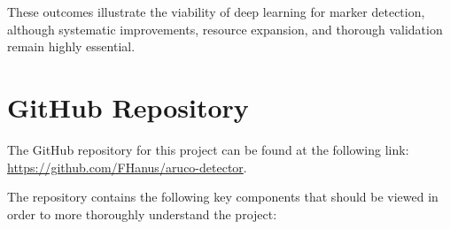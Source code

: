 \documentclass[conference]{IEEEtran}
\begin{document}
These outcomes illustrate the viability of deep learning for marker detection, although systematic improvements, resource expansion,
and thorough validation remain highly essential.

\printbibsection

\appendices

\renewcommand{\thesection}{\Alph{section}}

\section{GitHub Repository}

The GitHub repository for this project can be found at the following link: \url{https://github.com/FHanus/aruco-detector}.

The repository contains the following key components that should be viewed in order to more thoroughly understand the project:
\end{document}
